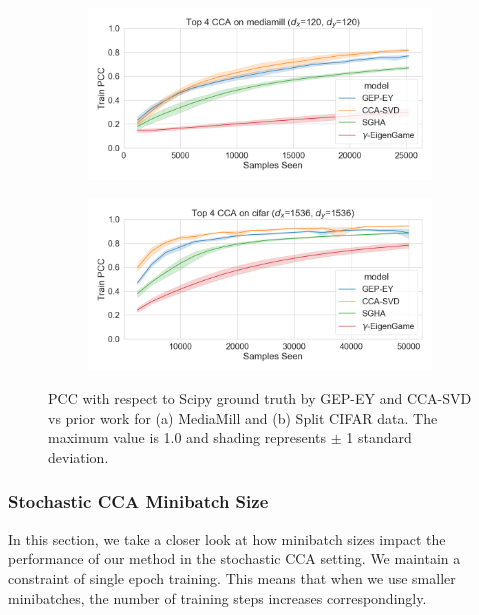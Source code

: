 \begin{figure}%
    \centering
    \begin{subfigure}[b]{0.49\textwidth}
        \centering
        \includegraphics[width=\textwidth]{figures/gradient_descent/CCA/mediamill_100_pcc_lr_tuned.png}
        \label{fig:ccamediamill}
    \end{subfigure}
    \hfill
    \begin{subfigure}[b]{0.49\textwidth}
        \centering
        \includegraphics[width=\textwidth]{figures/gradient_descent/CCA/cifar_100_pcc_lr_tuned.png}
        \label{fig:ccacifar}
    \end{subfigure}
    \caption{PCC with respect to Scipy ground truth by GEP-EY and CCA-SVD vs prior work for (a) MediaMill and (b) Split CIFAR data. The maximum value is 1.0 and shading represents $\pm$ 1 standard deviation.}
    \label{fig:ccaiter}
    \label{fig: stochasticcca}
\end{figure}

\subsubsection{Stochastic CCA Minibatch Size}
In this section, we take a closer look at how minibatch sizes impact the performance of our method in the stochastic CCA setting. We maintain a constraint of single epoch training. This means that when we use smaller minibatches, the number of training steps increases correspondingly.

